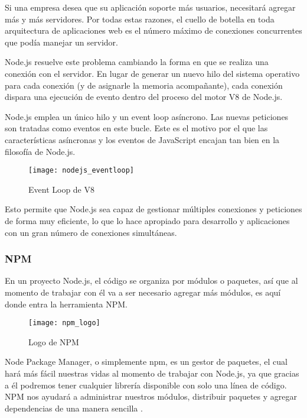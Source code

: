 Si una empresa desea que su aplicación soporte más usuarios, necesitará agregar más y más servidores. Por todas estas razones, el cuello de botella en toda arquitectura de aplicaciones web es el número máximo de conexiones concurrentes que podía manejar un servidor.

Node.js resuelve este problema cambiando la forma en que se realiza una conexión con el servidor. En lugar de generar un nuevo hilo del sistema operativo para cada conexión (y de asignarle la memoria acompañante), cada conexión dispara una ejecución de evento dentro del proceso del motor V8 de Node.js.

Node.js emplea un único hilo y un event loop asíncrono. Las nuevas peticiones son tratadas como eventos en este bucle. Este es el motivo por el que las características asíncronas y los eventos de JavaScript encajan tan bien en la filosofía de Node.js.

\begin{figure}[htp!]
  \centering
  \texttt{[image: nodejs\_eventloop]}
  \caption{Event Loop de V8}
  \label{fig:nodejs_eventloop}
\end{figure}

Esto permite que Node.js sea capaz de gestionar múltiples conexiones y peticiones de forma muy eficiente, lo que lo hace apropiado para desarrollo y aplicaciones con un gran número de conexiones simultáneas.

\subsubsection{NPM}

En un proyecto Node.js, el código se organiza por módulos o paquetes, así que al momento de trabajar con él va a ser necesario agregar más módulos, es aquí donde entra la herramienta NPM.

\begin{figure}[htp!]
  \centering
  \texttt{[image: npm\_logo]}
  \caption{Logo de NPM}
  \label{fig:npm_logo}
\end{figure}

Node Package Manager, o simplemente npm, es un gestor de paquetes, el cual hará más fácil nuestras vidas al momento de trabajar con Node.js, ya que gracias a él podremos tener cualquier librería disponible con solo una línea de código. NPM nos ayudará a administrar nuestros módulos, distribuir paquetes y agregar dependencias de una manera sencilla \cite{npm1}.

